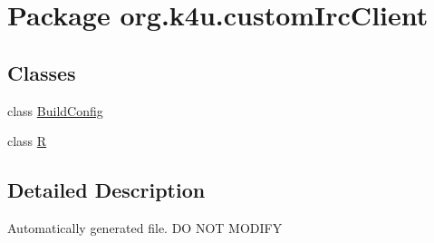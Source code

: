 \hypertarget{namespaceorg_1_1k4u_1_1custom_irc_client}{\section{Package org.\-k4u.\-custom\-Irc\-Client}
\label{dc/d04/namespaceorg_1_1k4u_1_1custom_irc_client}
}
\subsection*{Classes}
\begin{DoxyCompactItemize}
\item 
class \hyperlink{classorg_1_1k4u_1_1custom_irc_client_1_1_build_config}{Build\-Config}
\item 
class \hyperlink{classorg_1_1k4u_1_1custom_irc_client_1_1_r}{R}
\end{DoxyCompactItemize}


\subsection{Detailed Description}
Automatically generated file. D\-O N\-O\-T M\-O\-D\-I\-F\-Y 